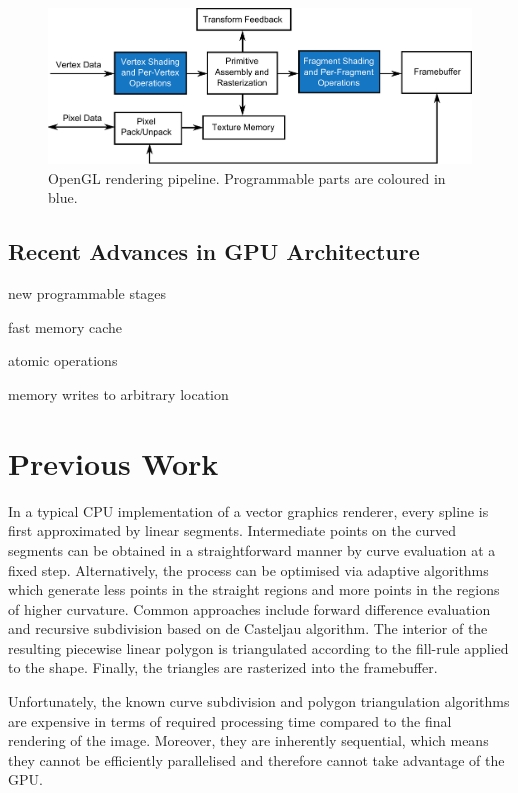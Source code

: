\documentclass[11pt,a4paper,twoside]{article}
\begin{document}
\begin {figure}
	\centering
	\includegraphics [width=1.0\columnwidth]{figures/gl_pipeline}
	\caption {OpenGL rendering pipeline. Programmable parts are coloured in blue.}
	\label {fig:gl_pipeline}
\end {figure}

\subsection{Recent Advances in GPU Architecture}

new programmable stages

fast memory cache

atomic operations

memory writes to arbitrary location

\section {Previous Work}

In a typical CPU implementation of a vector graphics renderer, every spline is first approximated by linear segments. Intermediate points on the curved segments can be obtained in a straightforward manner by curve evaluation at a fixed step. Alternatively, the process can be optimised via adaptive algorithms which generate less points in the straight regions and more points in the regions of higher curvature. Common approaches include forward difference evaluation and recursive subdivision based on de Casteljau algorithm.  The interior of the resulting piecewise linear polygon is triangulated according to the fill-rule applied to the shape. Finally, the triangles are rasterized into the framebuffer.

Unfortunately, the known curve subdivision and polygon triangulation algorithms are expensive in terms of required processing time compared to the final rendering of the image. Moreover, they are inherently sequential, which means they cannot be efficiently parallelised and therefore cannot take advantage of the GPU.
\end{document}
